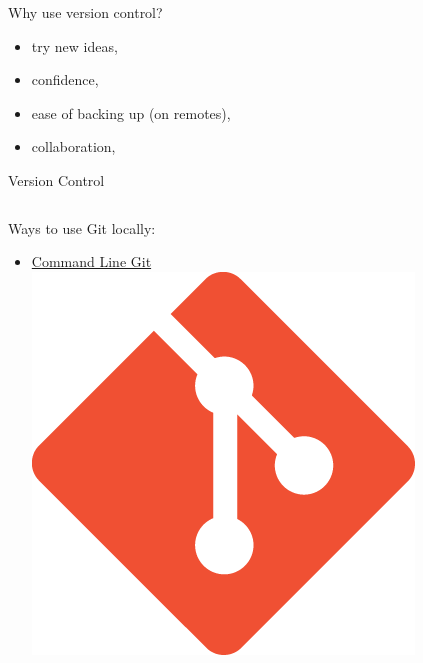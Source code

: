 \documentclass{beamer} %
\begin{document}
  \begin{frame}{Why use version control?}

    \begin{itemize}
      \item try new ideas,
      \item confidence,
      \item ease of backing up (on remotes),
      \item collaboration,
    \end{itemize}
    
  \end{frame}


  \begin{frame}{Version Control}
    \begin{columns}
      \begin{column}{0.5\textwidth}
        Ways to use Git locally:
        \begin{itemize}
          \item \href{https://git-scm.com/}{Command Line Git \includegraphics[height=.05\textheight]{git}}

\end{itemize}
\end{column}
\end{columns}
\end{frame}
\end{document}
